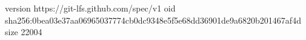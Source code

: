 version https://git-lfs.github.com/spec/v1
oid sha256:0bea03e37aa06965037774cb0dc9348e5f5e68dd36901de9a6820b201467af4d
size 22004
